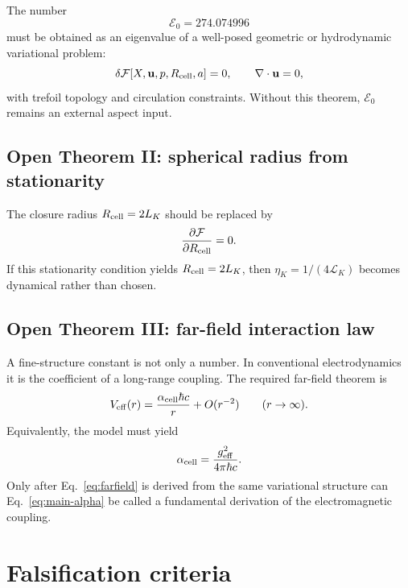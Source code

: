 \documentclass[11pt]{article}
\newcommand{\LK}{\mathcal L_K}
\newcommand{\Ezero}{\mathcal E_0}
\newcommand{\alphacell}{\alpha_{\rm cell}}
\begin{document}
The number
\begin{equation}
  \Ezero=274.074996
\end{equation}
must be obtained as an eigenvalue of a well-posed geometric or hydrodynamic variational
problem:
\begin{equation}
  \delta \mathcal F[X,\mathbf u,p,R_{\rm cell},a]=0,
  \qquad
  \nabla\cdot\mathbf u=0,
\end{equation}
with trefoil topology and circulation constraints.  Without this theorem, \(\Ezero\) remains
an external aspect input.

\subsection{Open Theorem II: spherical radius from stationarity}

The closure radius \(R_{\rm cell}=2L_K\) should be replaced by
\begin{equation}
  \frac{\partial \mathcal F}{\partial R_{\rm cell}}=0.
\end{equation}
If this stationarity condition yields \(R_{\rm cell}=2L_K\), then
\(\eta_K=1/(4\LK)\) becomes dynamical rather than chosen.

\subsection{Open Theorem III: far-field interaction law}

A fine-structure constant is not only a number.  In conventional electrodynamics it is the
coefficient of a long-range coupling.  The required far-field theorem is
\begin{equation}
  V_{\rm eff}(r)
  =
  \frac{\alphacell\hbar c}{r}
  +
  O(r^{-2})
  \qquad (r\to\infty).
  \label{eq:farfield}
\end{equation}
Equivalently, the model must yield
\begin{equation}
  \alphacell
  =
  \frac{g_{\rm eff}^2}{4\pi\hbar c}.
\end{equation}
Only after Eq.~\eqref{eq:farfield} is derived from the same variational structure can
Eq.~\eqref{eq:main-alpha} be called a fundamental derivation of the electromagnetic coupling.

\section{Falsification criteria}
\end{document}
